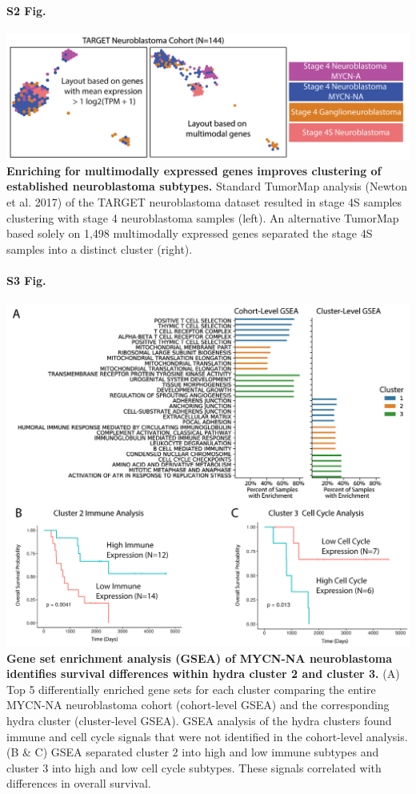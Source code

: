 \documentclass[10pt,letterpaper]{article}
\begin{document}
\paragraph*{S2 Fig.}
\includegraphics[width=\textwidth]{img/TumorMap-NBL-MM-V3-2x}
\label{S2_Fig}
{\bf Enriching for multimodally expressed genes improves clustering of established neuroblastoma subtypes.} Standard TumorMap analysis (Newton et al. 2017) of the TARGET neuroblastoma dataset resulted in stage 4S samples clustering with stage 4 neuroblastoma samples (left). An alternative TumorMap based solely on 1,498 multimodally expressed genes separated the stage 4S samples into a distinct cluster (right).

\paragraph*{S3 Fig.}
\includegraphics[width=\textwidth]{img/SubCluster-Analysis-V2@2x.png}
\label{S3_Fig} {\bf Gene set enrichment analysis (GSEA) of MYCN-NA neuroblastoma identifies survival differences within hydra cluster 2 and cluster 3.} (A) Top 5 differentially enriched gene sets for each cluster comparing the entire MYCN-NA neuroblastoma cohort (cohort-level GSEA) and the corresponding hydra cluster (cluster-level GSEA). GSEA analysis of the hydra clusters found immune and cell cycle signals that were not identified in the cohort-level analysis. (B \& C) GSEA separated cluster 2 into high and low immune subtypes and cluster 3 into high and low cell cycle subtypes. These signals correlated with differences in overall survival. 
\end{document}
